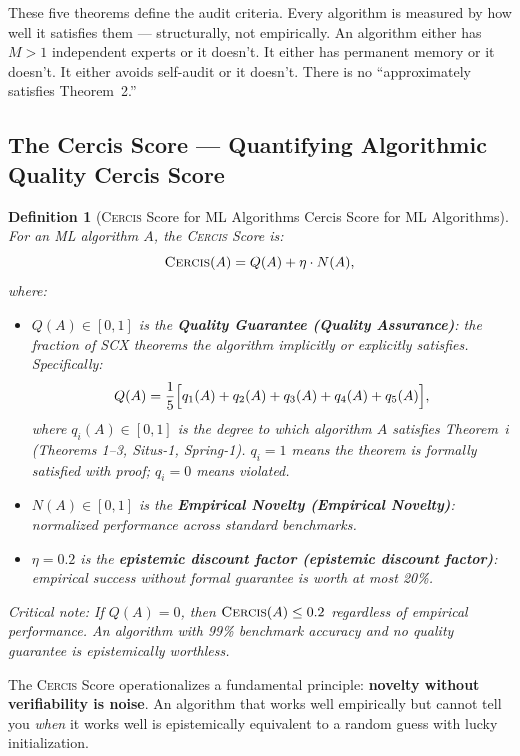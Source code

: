 \documentclass[12pt,a4paper]{article}
\newtheorem{definition}[theorem]{Definition}
\theoremstyle{definition}
\newcommand{\Cercis}{\textsc{Cercis}}
\newcommand{\SCX}{\textsc{SCX}}
\begin{document}
These five theorems define the audit criteria. Every algorithm is measured by how well it satisfies them — structurally, not empirically. An algorithm either has $M>1$ independent experts or it doesn't. It either has permanent memory or it doesn't. It either avoids self-audit or it doesn't. There is no ``approximately satisfies Theorem~2.''

\subsection{The Cercis Score — Quantifying Algorithmic Quality Cercis Score}

\begin{definition}[\Cercis{} Score for ML Algorithms Cercis Score for ML Algorithms]
\label{def:cercis_ml}
For an ML algorithm $A$, the \Cercis{} Score is:
\begin{equation}\label{eq:cercis}
    \Cercis(A) = Q(A) + \eta \cdot N(A),
\end{equation}
where:
\begin{itemize}[nosep]
    \item $Q(A) \in [0,1]$ is the \textbf{Quality Guarantee (Quality Assurance)}: the fraction of \SCX{} theorems the algorithm implicitly or explicitly satisfies. Specifically:
    \begin{equation}\label{eq:Q_decomposed}
        Q(A) = \frac{1}{5}\Bigl[q_1(A) + q_2(A) + q_3(A) + q_4(A) + q_5(A)\Bigr],
    \end{equation}
    where $q_i(A) \in [0,1]$ is the degree to which algorithm $A$ satisfies Theorem~$i$ (Theorems 1--3, Situs-1, Spring-1). $q_i = 1$ means the theorem is formally satisfied with proof; $q_i = 0$ means violated.
    \item $N(A) \in [0,1]$ is the \textbf{Empirical Novelty (Empirical Novelty)}: normalized performance across standard benchmarks.
    \item $\eta = 0.2$ is the \textbf{epistemic discount factor (epistemic discount factor)}: empirical success without formal guarantee is worth at most 20\%.
\end{itemize}
\textit{Critical note:} If $Q(A) = 0$, then $\Cercis(A) \le 0.2$ regardless of empirical performance. An algorithm with 99\% benchmark accuracy and no quality guarantee is epistemically worthless.
\end{definition}

The \Cercis{} Score operationalizes a fundamental principle: \textbf{novelty without verifiability is noise}. An algorithm that works well empirically but cannot tell you \textit{when} it works well is epistemically equivalent to a random guess with lucky initialization.
\end{document}
